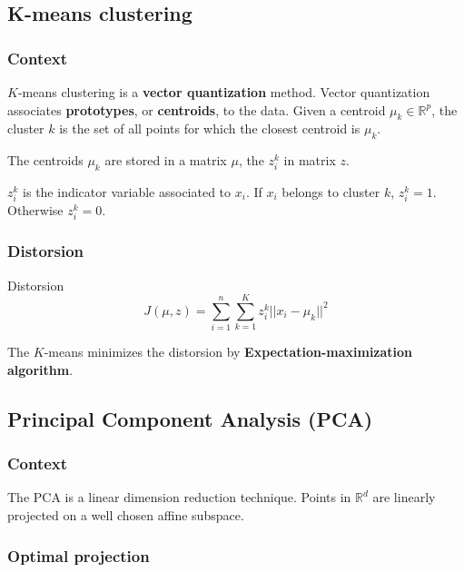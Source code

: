 \documentclass[
10pt, %
a4paper, %
oneside, %
headinclude,footinclude, %
BCOR5mm, %
]{scrartcl}
\begin{document}
\subsection{\large\color{MidnightBlue}K-means clustering}

\subsubsection{\large\color{Periwinkle}Context}

$K$-means clustering is a \textbf{{vector quantization}} method. Vector  quantization associates \textbf{{prototypes}}, or \textbf{{centroids}}, to the data. Given a centroid $\mu_k\in \mathbb{R}^p$, the cluster $k$ is the set of all points for which the closest centroid is $\mu_k$.

The centroids $\mu_k$ are stored in a matrix $\mu$, the $z_i^k$ in matrix $z$.

$z_i^k$ is the indicator variable associated to $x_i$. If $x_i$ belongs to cluster $k$, $z_i^k=1$. Otherwise $z_i^k=0$.

\subsubsection{\large\color{Periwinkle}Distorsion}

\begin{definition}{Distorsion}
    \begin{equation*}
    J(\mu, z) = \sum^{n}_{i=1} \sum^{K}_{k=1} z_i^k||x_i-\mu_k||^2
    \end{equation*}
\end{definition}

The $K$-means minimizes the distorsion by \textbf{{Expectation-maximization algorithm}}.

\subsection{\large\color{MidnightBlue}Principal Component Analysis (PCA)}

\subsubsection{\large\color{Periwinkle}Context}

The PCA is a linear dimension reduction technique. Points in $ \mathbb{R}^d$ are linearly projected on a well chosen affine subspace.

\subsubsection{\large\color{Periwinkle}Optimal projection}
\end{document}
